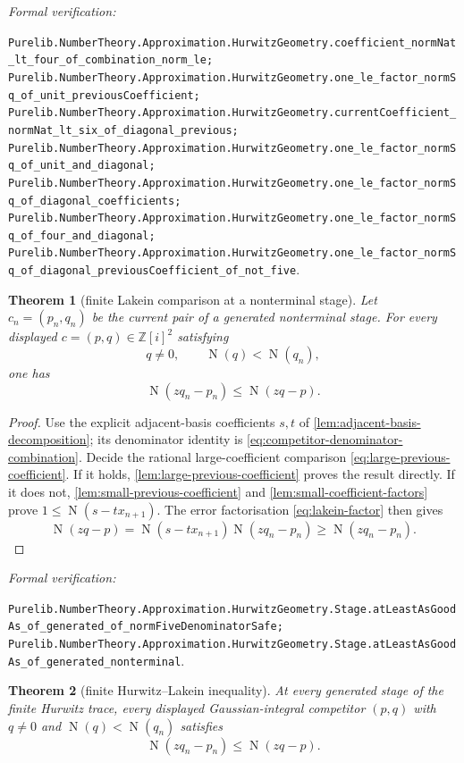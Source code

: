 \documentclass[11pt]{article}
\newtheorem{theorem}{Theorem}[section]
\newcommand{\Zi}{\mathbb{Z}[i]}
\newcommand{\Norm}[1]{\operatorname{N}\!\left(#1\right)}
\newcommand{\leanref}[1]{\par\smallskip\noindent
  \emph{Formal verification:}\par\nobreak
  {\raggedright\nolinkurl{#1}.\par}}
\begin{document}
\leanref{Purelib.NumberTheory.Approximation.HurwitzGeometry.coefficient_normNat_lt_four_of_combination_norm_le;
Purelib.NumberTheory.Approximation.HurwitzGeometry.one_le_factor_normSq_of_unit_previousCoefficient;
Purelib.NumberTheory.Approximation.HurwitzGeometry.currentCoefficient_normNat_lt_six_of_diagonal_previous;
Purelib.NumberTheory.Approximation.HurwitzGeometry.one_le_factor_normSq_of_unit_and_diagonal;
Purelib.NumberTheory.Approximation.HurwitzGeometry.one_le_factor_normSq_of_diagonal_coefficients;
Purelib.NumberTheory.Approximation.HurwitzGeometry.one_le_factor_normSq_of_four_and_diagonal;
Purelib.NumberTheory.Approximation.HurwitzGeometry.one_le_factor_normSq_of_diagonal_previousCoefficient_of_not_five}

\begin{theorem}[finite Lakein comparison at a nonterminal stage]
\label{thm:finite-lakein-nonterminal}
Let $c_n=(p_n,q_n)$ be the current pair of a generated nonterminal stage.
For every displayed $c=(p,q)\in\Zi^2$ satisfying
\[
                         q\ne0,
             \qquad      \Norm q<\Norm{q_n},
\]
one has
\begin{equation}
\label{eq:finite-lakein-nonterminal}
                         \Norm{zq_n-p_n}\le\Norm{zq-p}.
\end{equation}
\end{theorem}

\begin{proof}
Use the explicit adjacent-basis coefficients $s,t$ of
\cref{lem:adjacent-basis-decomposition}; its denominator identity is
\eqref{eq:competitor-denominator-combination}.  Decide the rational
large-coefficient comparison \eqref{eq:large-previous-coefficient}.  If it
holds, \cref{lem:large-previous-coefficient} proves the result directly.  If
it does not, \cref{lem:small-previous-coefficient} and
\cref{lem:small-coefficient-factors} prove
$1\le\Norm{s-tx_{n+1}}$.  The error factorisation
\eqref{eq:lakein-factor} then gives
\[
 \Norm{zq-p}
   =\Norm{s-tx_{n+1}}\Norm{zq_n-p_n}
   \ge\Norm{zq_n-p_n}.
\]
\end{proof}

\leanref{Purelib.NumberTheory.Approximation.HurwitzGeometry.Stage.atLeastAsGoodAs_of_generated_of_normFiveDenominatorSafe;
Purelib.NumberTheory.Approximation.HurwitzGeometry.Stage.atLeastAsGoodAs_of_generated_nonterminal}

\begin{theorem}[finite Hurwitz--Lakein inequality]
\label{thm:finite-lakein-full}
At every generated stage of the finite Hurwitz trace, every displayed
Gaussian-integral competitor $(p,q)$ with
$q\ne0$ and $\Norm q<\Norm{q_n}$ satisfies
\begin{equation}
\label{eq:finite-lakein-full}
                         \Norm{zq_n-p_n}\le\Norm{zq-p}.
\end{equation}
\end{theorem}
\end{document}
